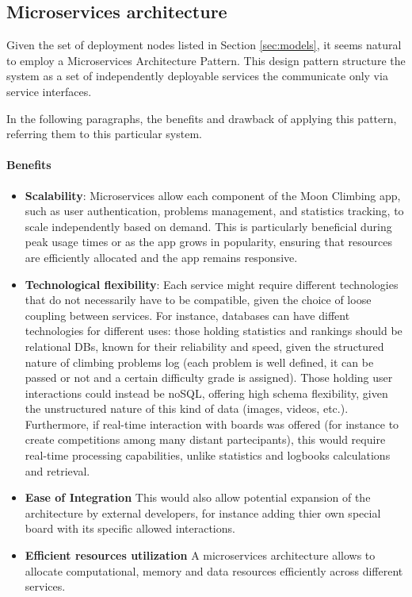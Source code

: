 \documentclass{article}
\begin{document}
\subsection{Microservices architecture}
Given the set of deployment nodes listed in Section \ref{sec:models}, it seems natural to employ a Microservices Architecture Pattern.
This design pattern structure the system as a set of independently deployable services the communicate only via service interfaces.

In the following paragraphs, the benefits and drawback of applying this pattern, referring them to this particular system.
\paragraph*{Benefits}
\begin{itemize}
    \item \textbf{Scalability}:
    Microservices allow each component of the Moon Climbing app, such as user authentication, problems management, and statistics tracking, to scale independently based on demand. This is particularly beneficial during peak usage times or as the app grows in popularity, ensuring that resources are efficiently allocated and the app remains responsive.    
    \item \textbf{Technological flexibility}:
    Each service might require different technologies that do not necessarily have to be compatible, given the choice of loose coupling between services. For instance, databases can have diffent technologies for different uses: those holding statistics and rankings should be relational DBs, known for their reliability and speed, given the structured nature of climbing problems log (each problem is well defined, it can be passed or not and a certain difficulty grade is assigned). Those holding user interactions could instead be noSQL, offering high schema flexibility, given the unstructured nature of this kind of data (images, videos, etc.).
    Furthermore, if real-time interaction with boards was offered (for instance to create competitions among many distant partecipants), this would require real-time processing capabilities, unlike statistics and logbooks calculations and retrieval.
    \item \textbf{Ease of Integration}
    This would also allow potential expansion of the architecture by external developers, for instance adding thier own special board with its specific allowed interactions.
    \item \textbf{Efficient resources utilization}
    A microservices architecture allows to allocate computational, memory and data resources efficiently across different services.
\end{itemize}
\end{document}
